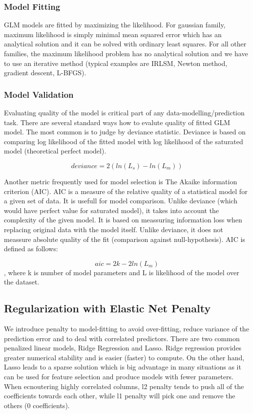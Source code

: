\documentclass[11pt]{article}
\begin{document}
\subsubsection{Model Fitting}
GLM models are fitted by maximizing the likelihood. For gaussian family, maximum likelihood is simply minimal mean squared error which has an analytical solution and it can be solved with ordinary least squares. For all other families, the maximum likelihood problem has no analytical solution and we have to use an iterative method (typical examples are IRLSM, Newton method, gradient descent, L-BFGS). 
\subsubsection{Model Validation}
Evaluating quality of the model is critical part of any data-modelling/prediction task. There are several standard ways how to evalute quality of fitted GLM model. The most common is to judge by deviance statistic. Deviance is based on comparing log likelihood of the fitted model with log likelihood of the saturated model (theoretical perfect model).

\[ deviance = 2({ln(L_{s})} - {ln(L_{m})}) \]

Another metric frequently used for model selection is The Akaike information criterion (AIC). AIC is a measure of the relative quality of a statistical model for a given set of data. It is usefull for model comparison. Unlike deviance (which would have perfect value for saturated model), it takes into account the complexity of the given model. It is based on meassuring information loss when replacing original data with the model itself. Unlike deviance, it does not meassure absolute quality of the fit (comparison against null-hypothesis). AIC is defined as follows:

\[ aic = 2k - 2ln(L_{m})\]
, where k is number of model parameters and L is likelihood of the model over the dataset.

\subsection{Regularization with Elastic Net Penalty} 
We introduce penalty to model-fitting to avoid over-fitting, reduce variance of the prediction error and to deal with correlated predictors. There are two common penalized linear models, Ridge Regression and Lasso. Ridge regression provides greater numerical stability and is easier (faster) to compute. On the other hand, Lasso leads to a sparse solution which is big advantage in many situations as it can be used for feature selection and produce models with fewer parameters. When ecnoutering highly correlated columns, l2 penalty tends to push all of the coefficients towards each other, while l1 penalty will pick one and remove the others (0 coefficients).
\end{document}
